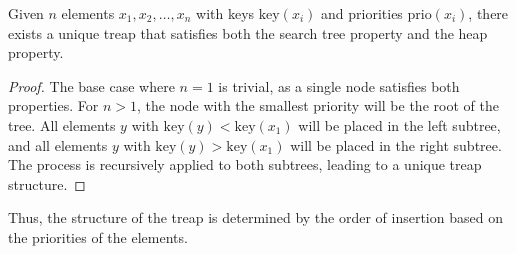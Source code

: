 \begin{lemma}
    Given $n$ elements $x_1, x_2,\dots, x_n$ with keys $\text{key}(x_i)$ and priorities $\text{prio}(x_i)$, there exists a unique treap that satisfies both the search tree property and the heap property.
\end{lemma}
\begin{proof}
    The base case where $n=1$ is trivial, as a single node satisfies both properties.
    For $n>1$, the node with the smallest priority will be the root of the tree.
    All elements $y$ with $\text{key}(y)<\text{key}(x_1)$ will be placed in the left subtree, and all elements $y$ with $\text{key}(y)>\text{key}(x_1)$ will be placed in the right subtree.
    The process is recursively applied to both subtrees, leading to a unique treap structure.
\end{proof}
Thus, the structure of the treap is determined by the order of insertion based on the priorities of the elements.

